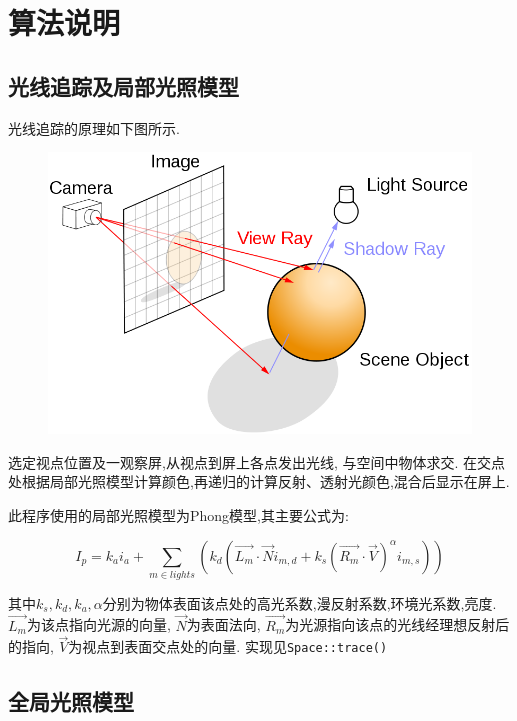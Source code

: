 \section{算法说明}
\subsection{光线追踪及局部光照模型}
光线追踪的原理如下图所示.
\begin{figure}[H]
  \centering
  \includegraphics[scale=0.4]{res/ray_tracing.png}
\end{figure}

选定视点位置及一观察屏,从视点到屏上各点发出光线, 与空间中物体求交.
在交点处根据局部光照模型计算颜色,再递归的计算反射、透射光颜色,混合后显示在屏上.

此程序使用的局部光照模型为Phong模型,其主要公式为\cite{phong}:

\[  I_p = k_ai_a + \sum_{m\in lights} (k_d ( \overrightarrow{L_m} \cdot \overrightarrow{N} i_{m, d} + k_s(\overrightarrow{R_m}\cdot
  \overrightarrow{V})^{\alpha} i_{m, s}))  \]

其中$ k_s, k_d, k_a, \alpha$分别为物体表面该点处的高光系数,漫反射系数,环境光系数,亮度.
$ \overrightarrow{L_m}$为该点指向光源的向量, $ \overrightarrow{N}$为表面法向,
$ \overrightarrow{R_m}$为光源指向该点的光线经理想反射后的指向,
$ \overrightarrow{V}$为视点到表面交点处的向量. 实现见\verb|Space::trace()|

\subsection{全局光照模型}


